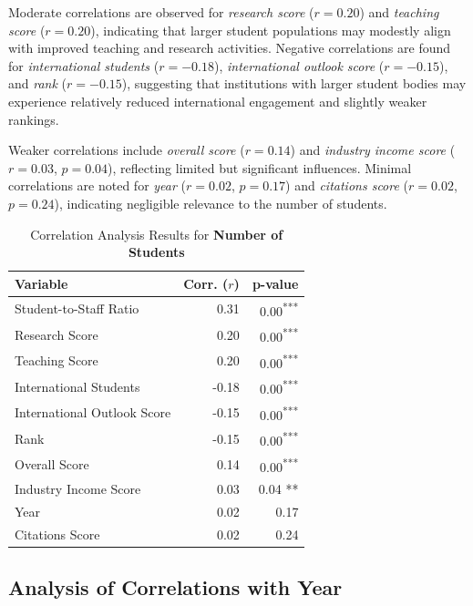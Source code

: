 \documentclass[sigconf]{acmart}
\begin{document}
Moderate correlations are observed for \textit{research score} ($r = 0.20$) and \textit{teaching score} ($r = 0.20$), indicating that larger student populations may modestly align with improved teaching and research activities. Negative correlations are found for \textit{international students} ($r = -0.18$), \textit{international outlook score} ($r = -0.15$), and \textit{rank} ($r = -0.15$), suggesting that institutions with larger student bodies may experience relatively reduced international engagement and slightly weaker rankings.

Weaker correlations include \textit{overall score} ($r = 0.14$) and \textit{industry income score} ($r = 0.03$, $p = 0.04$), reflecting limited but significant influences. Minimal correlations are noted for \textit{year} ($r = 0.02$, $p = 0.17$) and \textit{citations score} ($r = 0.02$, $p = 0.24$), indicating negligible relevance to the number of students.

\begin{table}[h!]
	\centering
	\caption{Correlation Analysis Results for \textbf{Number of Students}}
	\label{tab:correlation_number_students}
	\begin{tabular}{|l|r|r|}
		\hline
		\textbf{Variable} & \textbf{Corr. ($r$)} & \textbf{p-value} \\
		\hline
		Student-to-Staff Ratio & 0.31 & 0.00\textsuperscript{***} \\
		Research Score & 0.20 & 0.00\textsuperscript{***} \\
		Teaching Score & 0.20 & 0.00\textsuperscript{***} \\
		International Students & -0.18 & 0.00\textsuperscript{***} \\
		International Outlook Score & -0.15 & 0.00\textsuperscript{***} \\
		Rank & -0.15 & 0.00\textsuperscript{***} \\
		Overall Score & 0.14 & 0.00\textsuperscript{***} \\
		Industry Income Score & 0.03 & 0.04 ** \\
		Year & 0.02 & 0.17 \\
		Citations Score & 0.02 & 0.24 \\
		\hline
	\end{tabular}
\end{table}


\subsection{Analysis of Correlations with Year}
\end{document}
